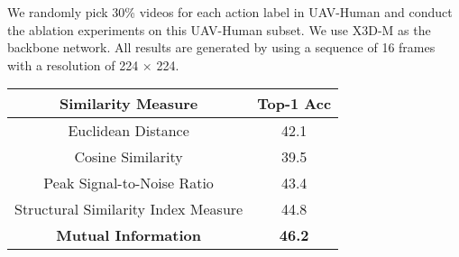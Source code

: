 \documentclass[10pt,twocolumn,letterpaper]{article}
\begin{document}
{We randomly pick 30\% videos for each action label in UAV-Human and conduct the ablation experiments on this UAV-Human subset. We use X3D-M\cite{feichtenhofer2020x3d} as the backbone network. All results are generated by using a sequence of 16 frames with a resolution of 224 × 224.


\begin{table}
\centering
\begin{center}
\vspace{-7pt}
\caption{Mutual Information Sampling (MIS) ablation studies on UAV-Human-subset and Drone Action. The baseline is vanilla X3D with TFA, we test the MITFAS Sampling in terms of  two hyperparameters for mutual information and joint mutual information, $\alpha$ and $\beta$ respectively. From our experiments, MITFAS obtains the best accuracy when $\alpha=1.0$ and $\beta=1.0$.  }
\vspace{-5pt}
\label{tab:sampling_ablation}
\end{center}
\end{table} \begin{table}
\centering
\begin{tabular}{c c }
\toprule
Similarity Measure  & Top-1 Acc  \\
\midrule
Euclidean Distance & 42.1  \\
Cosine Similarity &39.5  \\
Peak Signal-to-Noise Ratio & 43.4 \\
Structural Similarity Index Measure & 44.8  \\
\textbf{Mutual Information} & \textbf{46.2} \\


\end{tabular}
\end{table}}
\end{document}
